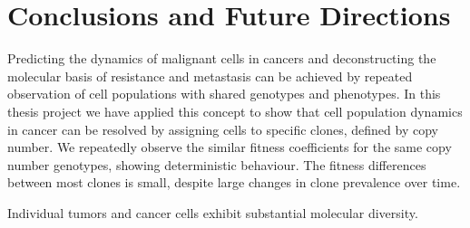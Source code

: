 
{\chapter{Conclusions and Future Directions}

}
\label{ch:Chapter6}
Predicting the dynamics of malignant cells in cancers and deconstructing the molecular basis of resistance and metastasis can be achieved by repeated observation of cell populations with shared genotypes and phenotypes. In this thesis project we have applied this concept to show that cell population dynamics in cancer can be resolved by assigning cells to specific clones, defined by copy number. We repeatedly observe the similar fitness coefficients for the same copy number genotypes, showing deterministic behaviour. The fitness differences between most clones is small, despite large changes in clone prevalence over time.






Individual tumors and cancer cells exhibit substantial molecular diversity.
